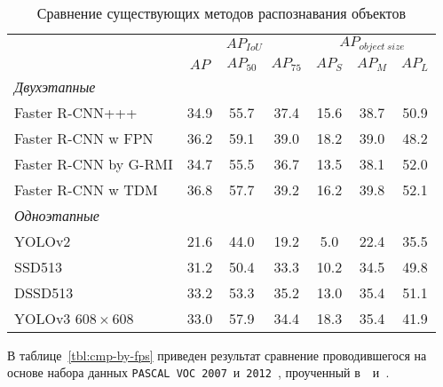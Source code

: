 \begin{table}[!h]
    \small
    \begin{center}
        \caption{Сравнение существующих методов распознавания объектов}
        \label{tbl:cmp-by-ap}
        \begin{tabular}{|l|ccc|ccc|}
            \hline
            & \multicolumn{3}{c|}{$AP_{IoU}$} & \multicolumn{3}{c|}{$AP_{object~size}$} \\
            & $AP$ & $AP_{50}$ & $AP_{75}$ & $AP_S$ & $AP_M$ & $AP_L$ \\\hline

            \textit{Двухэтапные} & & & & & & \\
            Faster R-CNN+++         & 34.9 & 55.7 & 37.4 & 15.6 & 38.7 & 50.9 \\
            Faster R-CNN w FPN      & 36.2 & 59.1 & 39.0 & 18.2 & 39.0 & 48.2 \\
            Faster R-CNN by G-RMI   & 34.7 & 55.5 & 36.7 & 13.5 & 38.1 & 52.0 \\
            Faster R-CNN w TDM      & 36.8 & 57.7 & 39.2 & 16.2 & 39.8 & 52.1 \\\hline
            \textit{Одноэтапные} & & & & & & \\
            YOLOv2                  & 21.6 & 44.0 & 19.2 & 5.0 & 22.4 & 35.5 \\
            SSD513                  & 31.2 & 50.4 & 33.3 & 10.2 & 34.5 & 49.8 \\
            DSSD513                 & 33.2 & 53.3 & 35.2 & 13.0 & 35.4 & 51.1 \\
            YOLOv3 $608 \times 608$ & 33.0 & 57.9 & 34.4 & 18.3 & 35.4 & 41.9 \\
            \hline
        \end{tabular}
    \end{center}
\end{table}

В таблице~\ref{tbl:cmp-by-fps} приведен результат сравнение проводившегося на основе набора данных \texttt{PASCAL VOC}~\texttt{2007}~и~\texttt{2012}~\cite{pascal-voc-dataset}, проученный в~\cite{yolov3}~и~\cite{ssd}.

